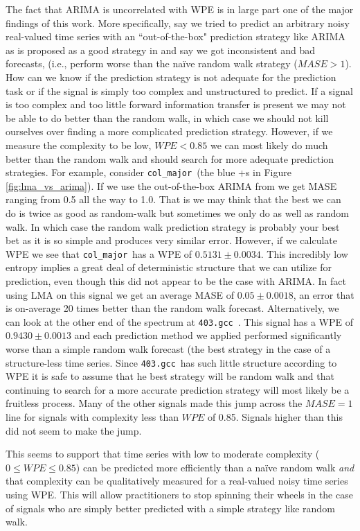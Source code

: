 \documentclass{article}
\newcommand{\gcc}{{\tt 403.gcc}~}
\newcommand{\col}{{\tt col\_major}~}
\begin{document}
The fact that ARIMA is uncorrelated with WPE is in large part one of the major findings of this work. More specifically, say we tried to predict an arbitrary noisy real-valued time series with an ``out-of-the-box" prediction strategy like ARIMA as is proposed as a good strategy in \cite{autoArima} and say we got inconsistent and bad forecasts, (i.e., perform worse than the na\"ive random walk strategy ($MASE>1$). How can we know if the prediction strategy is not adequate for the prediction task or if the signal is simply too complex and unstructured to predict. If a signal is too complex and too little forward information transfer is present we may not be able to do better than the random walk, in which case we should not kill ourselves over finding a more complicated prediction strategy. However, if we measure the complexity to be low, $WPE<0.85$ we can most likely do much better than the random walk and should search for more adequate prediction strategies. For example, consider \col (the blue +s in Figure \ref{fig:lma_vs_arima}). If we use the out-of-the-box ARIMA from \cite{autoArima} we get MASE ranging from 0.5 all the way to 1.0. That is we may think that the best we can do is twice as good as random-walk but sometimes we only do as well as random walk. In which case the random walk prediction strategy is probably your best bet as it is so simple and produces very similar error. However, if we calculate WPE we see that \col has a WPE of $0.5131\pm 0.0034$. This incredibly low entropy implies a great deal of deterministic structure that we can utilize for prediction, even though this did not appear to be the case with ARIMA. In fact using LMA on this signal we get an average MASE of $0.05\pm0.0018$, an error that is on-average 20 times better than the random walk forecast. Alternatively, we can look at the other end of the spectrum at \gcc. This signal has a WPE of $0.9430\pm0.0013$ and each prediction method we applied performed significantly worse than a simple random walk forecast (the best strategy in the case of a structure-less time series. Since \gcc has such little structure according to WPE it is safe to assume that he best strategy will be random walk and that continuing to search for a more accurate prediction strategy will most likely be a fruitless process. Many of the other signals made this jump across the $MASE=1$ line for signals with complexity less than $WPE$ of 0.85. Signals higher than this did not seem to make the jump. 


This seems to support that time series with low to moderate complexity ($0\le WPE \le 0.85$) can be predicted more efficiently than a na\"ive random walk \emph{and} that complexity can be qualitatively measured for a real-valued noisy time series using WPE. This will allow practitioners to stop spinning their wheels in the case of signals who are simply better predicted with a simple strategy like random walk. 
\end{document}
